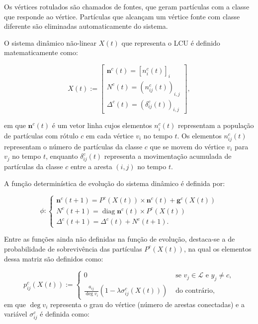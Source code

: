 Os vértices rotulados são chamados de fontes, que geram partículas com
a classe que responde ao vértice. Partículas que alcançam um vértice fonte
com classe diferente são eliminadas automaticamente do sistema.

O sistema dinâmico não-linear $X(t)$ que representa o \gls{LCU} é definido
matematicamente como:

\begin{equation}\label{eq:lcu-x}
  X(t):=\left[\begin{array}{c}
    \mathbf{n}^c(t)={\left[n_i^c(t)\right]}_i \\
    N^c(t)={\left(n_{i j}^c(t)\right)}_{i, j} \\
    \Delta^c(t)={\left(\delta_{i j}^c(t)\right)}_{i, j}
\end{array}\right],
\end{equation}

\noindent
em que $ \mathbf{n}^c(t)$ é um vetor linha cujos elementos $n_i^c(t)$
representam a população de partículas com rótulo $c$ em cada vértice
$v_i$ no tempo $t$. Os elementos $n_{i j}^c(t)$ representam o número
de partículas da classe $c$ que se movem do vértice $v_i$ para $v_j$ no
tempo $ t $, enquanto $\delta_{i j}^c(t)$ representa a movimentação
acumulada de partículas da classe $c$ entre a aresta $(i, j)$ no tempo
$t$.

A função determinística de evolução do sistema dinâmico é definida
por:

\begin{equation}\label{eq:lcu-phi-evolution}
  \phi:\left\{\begin{array}{l}
    \mathbf{n}^c(t+1)= P^c(X(t)) \times \mathbf{n}^c(t) +\mathbf{g}^c(X(t)) \\
    N^c(t+1)=\operatorname{diag} \mathbf{n}^c(t) \times P^c(X(t)) \\
    \Delta^c(t+1)=\Delta^c(t)+N^c(t+1).
  \end{array}\right.
\end{equation}

Entre as funções ainda não definidas na função de evolução, destaca-se a de
probabilidade de sobrevivência das partículas $P^c(X(t))$, na qual os
elementos dessa matriz são definidos como:

\begin{equation} \label{eq:lcu-probability}
  p_{i j}^c(X(t)):= \begin{cases}0 & \text { se } v_j \in \mathcal{L} \text { e
                                     } y_j \neq c, \\
    \frac{a_{i j}}{\deg v_i}\left(1-\lambda \sigma_{i
    j}^c(X(t))\right) & \text { do contrário, }\end{cases}
\end{equation}
\noindent
em que ${\deg v_i}$ representa o grau do vértice (número de arestas
conectadas) e a variável $\sigma_{i j}^c$ é definida como:

